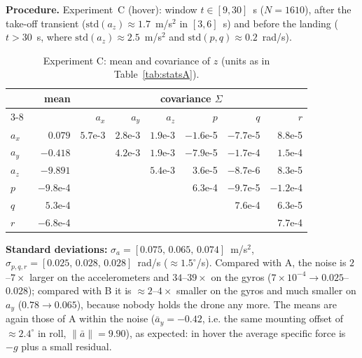 \textbf{Procedure.} Experiment~C (hover): window $t\in[9,30]$~s ($N=1610$), after the take-off transient
($\mathrm{std}(a_z)\approx1.7$~m/s$^2$ in $[3,6]$~s) and before the landing ($t>30$~s, where $\mathrm{std}(a_z)\approx2.5$~m/s$^2$ and $\mathrm{std}(p,q)\approx0.2$~rad/s).

\begin{table}[H]\centering\scriptsize\setlength{\tabcolsep}{4pt}
\caption{Experiment C: mean and covariance of $z$ (units as in Table~\ref{tab:statsA}).}
\begin{tabular}{l r rrr rrr}\toprule
 & mean & \multicolumn{6}{c}{covariance $\Sigma$}\\\cmidrule(lr){3-8}
 & & $a_x$ & $a_y$ & $a_z$ & $p$ & $q$ & $r$\\\midrule
$a_x$ & $\phantom{-}0.079$ & $5.7$e-3 & $2.8$e-3 & $1.9$e-3 & $-1.6$e-5 & $-7.7$e-5 & $8.8$e-5\\
$a_y$ & $-0.418$ & & $4.2$e-3 & $1.9$e-3 & $-7.9$e-5 & $-1.7$e-4 & $1.5$e-4\\
$a_z$ & $-9.891$ & & & $5.4$e-3 & $3.6$e-5 & $-8.7$e-6 & $8.3$e-5\\
$p$ & $-9.8$e-4 & & & & $6.3$e-4 & $-9.7$e-5 & $-1.2$e-4\\
$q$ & $\phantom{-}5.3$e-4 & & & & & $7.6$e-4 & $6.3$e-5\\
$r$ & $-6.8$e-4 & & & & & & $7.7$e-4\\\bottomrule
\end{tabular}
\end{table}

\textbf{Standard deviations:} $\sigma_a=[0.075,\,0.065,\,0.074]$~m/s$^2$, $\sigma_{p,q,r}=[0.025,\,0.028,\,0.028]$~rad/s ($\approx1.5^\circ$/s).
Compared with A, the noise is $2$--$7\times$ larger on the accelerometers and $34$--$39\times$ on the gyros ($7\times10^{-4}\to0.025$--$0.028$);
compared with B it is $\approx2$--$4\times$ smaller on the gyros and much smaller on $a_y$ ($0.78\to0.065$), because nobody holds the drone any more. The means are
again those of A within the noise ($\bar a_y=-0.42$, i.e. the same mounting offset of $\approx2.4^\circ$ in roll, $\|\bar a\|=9.90$), as expected: in hover the average specific force is $-g$ plus
a small residual.

